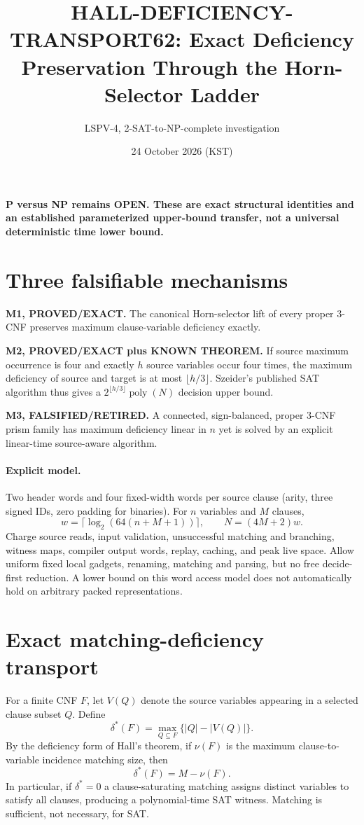 \documentclass[11pt]{article}
\title{HALL-DEFICIENCY-TRANSPORT62: Exact Deficiency Preservation Through the Horn-Selector Ladder}
\author{LSPV-4, 2-SAT-to-NP-complete investigation}
\date{24 October 2026 (KST)}
\begin{document}
\maketitle
\begin{center}\textbf{P versus NP remains OPEN. These are exact structural identities and an established parameterized upper-bound transfer, not a universal deterministic time lower bound.}\end{center}
\section{Three falsifiable mechanisms}
\noindent\textbf{M1, PROVED/EXACT.} The canonical Horn-selector lift of every proper 3-CNF preserves maximum clause-variable deficiency exactly.
\par\noindent\textbf{M2, PROVED/EXACT plus KNOWN THEOREM.} If source maximum occurrence is four and exactly $h$ source variables occur four times, the maximum deficiency of source and target is at most $\lfloor h/3\rfloor$. Szeider's published SAT algorithm thus gives a $2^{\lfloor h/3\rfloor}\operatorname{poly}(N)$ decision upper bound.
\par\noindent\textbf{M3, FALSIFIED/RETIRED.} A connected, sign-balanced, proper 3-CNF prism family has maximum deficiency linear in $n$ yet is solved by an explicit linear-time source-aware algorithm.
\paragraph{Explicit model.} Two header words and four fixed-width words per source clause (arity, three signed IDs, zero padding for binaries). For $n$ variables and $M$ clauses,
\[
w=\lceil\log_2(64(n+M+1))\rceil,\qquad N=(4M+2)w.
\]
Charge source reads, input validation, unsuccessful matching and branching, witness maps, compiler output words, replay, caching, and peak live space. Allow uniform fixed local gadgets, renaming, matching and parsing, but no free decide-first reduction. A lower bound on this word access model does not automatically hold on arbitrary packed representations.

\section{Exact matching-deficiency transport}
For a finite CNF $F$, let $V(Q)$ denote the source variables appearing in a selected clause subset $Q$. Define
\[
\delta^*(F)=\max_{Q\subseteq F}\{|Q|-|V(Q)|\}.
\]
By the deficiency form of Hall's theorem, if $\nu(F)$ is the maximum clause-to-variable incidence matching size, then
\[
\boxed{\delta^*(F)=M-\nu(F)}.
\]
In particular, if $\delta^*=0$ a clause-saturating matching assigns distinct variables to satisfy all clauses, producing a polynomial-time SAT witness. Matching is sufficient, not necessary, for SAT.
\end{document}
